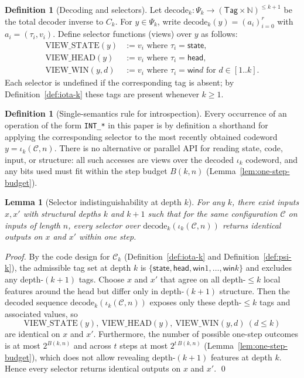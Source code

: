 \documentclass[11pt]{article}
\newtheorem{lemma}[theorem]{Lemma}
\theoremstyle{definition}
\newtheorem{definition}[theorem]{Definition}
\begin{document}
\begin{definition}[Decoding and selectors]
Let $\mathrm{decode}_k: \Psi_k \to (\mathsf{Tag}\times\mathbb{N})^{\le k+1}$ be the total decoder inverse to $C_k$. For $y\in\Psi_k$, write $\mathrm{decode}_k(y)=(a_i)_{i=0}^{r}$ with $a_i=(\tau_i,v_i)$. Define selector functions (views) over $y$ as follows:
\begin{align*}
\mathrm{VIEW\_STATE}(y) &:= v_i \text{ where } \tau_i=\textsf{state}, \\
\mathrm{VIEW\_HEAD}(y) &:= v_i \text{ where } \tau_i=\textsf{head}, \\
\mathrm{VIEW\_WIN}(y,d) &:= v_i \text{ where } \tau_i=\textsf{win}d \text{ for } d\in[1..k].
\end{align*}
Each selector is undefined if the corresponding tag is absent; by Definition~\ref{def:iota-k} these tags are present whenever $k\ge 1$.
\end{definition}

\begin{definition}[Single-semantics rule for introspection]
Every occurrence of an operation of the form \texttt{INT\_*} in this paper is by definition a shorthand for applying the corresponding selector to the most recently obtained codeword $y=\iota_k(\mathcal{C},n)$. There is no alternative or parallel API for reading state, code, input, or structure: all such accesses are views over the decoded $\iota_k$ codeword, and any bits used must fit within the step budget $B(k,n)$ (Lemma~\ref{lem:one-step-budget}).
\end{definition}

\begin{lemma}[Selector indistinguishability at depth $k$]
\label{lem:selector-indistinguishability}
For any $k$, there exist inputs $x,x'$ with structural depths $k$ and $k{+}1$ such that for the same configuration $\mathcal{C}$ on inputs of length $n$, every selector over $\mathrm{decode}_k(\iota_k(\mathcal{C},n))$ returns identical outputs on $x$ and $x'$ within one step.
\end{lemma}

\begin{proof}
By the code design for $\mathcal{C}_k$ (Definition~\ref{def:iota-k} and Definition~\ref{def:psi-k}), the admissible tag set at depth $k$ is $\{\textsf{state},\textsf{head},\textsf{win}1,\ldots,\textsf{win}k\}$ and excludes any depth-$(k{+}1)$ tags. Choose $x$ and $x'$ that agree on all depth-$\le k$ local features around the head but differ only in depth-$(k{+}1)$ structure. Then the decoded sequence $\mathrm{decode}_k(\iota_k(\mathcal{C},n))$ exposes only these depth-$\le k$ tags and associated values, so
\[\mathrm{VIEW\_STATE}(y),\ \mathrm{VIEW\_HEAD}(y),\ \mathrm{VIEW\_WIN}(y,d)~(d\le k)\]
are identical on $x$ and $x'$. Furthermore, the number of possible one-step outcomes is at most $2^{B(k,n)}$ and across $t$ steps at most $2^{t\,B(k,n)}$ (Lemma~\ref{lem:one-step-budget}), which does not allow revealing depth-$(k{+}1)$ features at depth $k$. Hence every selector returns identical outputs on $x$ and $x'$. \qed
\end{proof}
\end{document}
